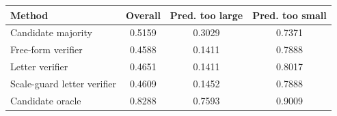 \begin{tabular}{lccc}
\toprule
Method & Overall & Pred. too large & Pred. too small \\
\midrule
Candidate majority & 0.5159 & 0.3029 & 0.7371 \\
Free-form verifier & 0.4588 & 0.1411 & 0.7888 \\
Letter verifier & 0.4651 & 0.1411 & 0.8017 \\
Scale-guard letter verifier & 0.4609 & 0.1452 & 0.7888 \\
Candidate oracle & 0.8288 & 0.7593 & 0.9009 \\
\bottomrule
\end{tabular}
